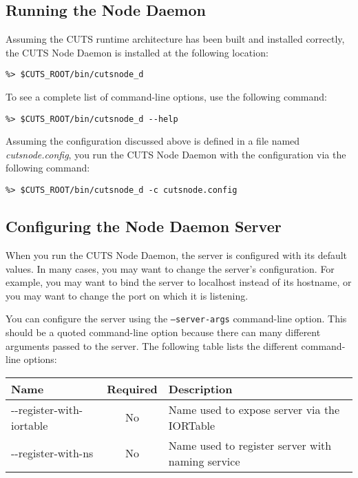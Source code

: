 \subsection{Running the Node Daemon}
\label{sec:node-daemon-config}

Assuming the CUTS runtime architecture has been built and installed 
correctly, the CUTS Node Daemon is installed at the following 
location:
\begin{lstlisting}
%> $CUTS_ROOT/bin/cutsnode_d
\end{lstlisting}
To see a complete list of command-line options, use the following 
command:
\begin{lstlisting}
%> $CUTS_ROOT/bin/cutsnode_d --help
\end{lstlisting}
Assuming the configuration discussed above is defined in a file 
named \textit{cutsnode.config}, you run the CUTS Node Daemon with
the configuration via the following command: 
\begin{lstlisting}
%> $CUTS_ROOT/bin/cutsnode_d -c cutsnode.config
\end{lstlisting}

\subsection{Configuring the Node Daemon Server}
\label{sec:node-daemon-server}

When you run the CUTS Node Daemon, the server is configured with 
its default values. In many cases, you may want to change
the server's configuration. For example, you may want to bind the
server to localhost instead of its hostname, or you may want to change
the port on which it is listening.

You can configure the server using the \texttt{--server-args}
command-line option. This should be a quoted command-line option because
there can many different arguments passed to the server. The following
table lists the different command-line options:
\begin{table}[h]
  \begin{tabular}{lcl}
  \hline
  \textbf{Name} & \textbf{Required} & \textbf{Description} \\
  \hline
  -\--register-with-iortable & No & Name used to expose server via the IORTable \\
  -\--register-with-ns & No & Name used to register server with naming service \\
  \end{tabular}
\end{table}

